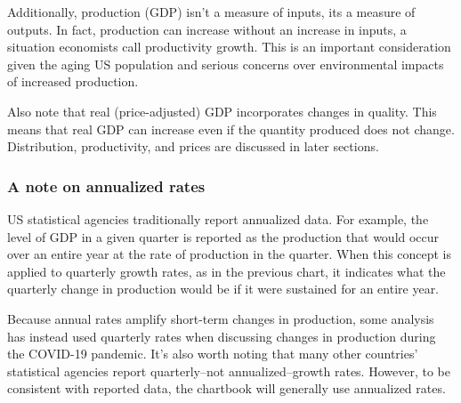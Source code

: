 \documentclass{report}
\begin{document}
\begin{minipage}{0.76\textwidth}
Additionally, production (GDP) isn't a measure of inputs, its a measure of outputs. In fact, production can increase without an increase in inputs, a situation economists call productivity growth. This is an important consideration given the aging US population and serious concerns over environmental impacts of increased production. 

Also note that real (price-adjusted) GDP incorporates changes in quality. This means that real GDP can increase even if the quantity produced does not change. Distribution, productivity, and prices are discussed in later sections.
\subsubsection*{\color{black!70}\seriffont A note on annualized rates}
\small US statistical agencies traditionally report annualized data. For example, the level of GDP in a given quarter is reported as the production that would occur over an entire year at the rate of production in the quarter. When this concept is applied to quarterly growth rates, as in the previous chart, it indicates what the quarterly change in production would be if it were sustained for an entire year. 

Because annual rates amplify short-term changes in production, some analysis has instead used quarterly rates when discussing changes in production during the COVID-19 pandemic. It's also worth noting that many other countries' statistical agencies report quarterly--not annualized--growth rates. However, to be consistent with reported data, the chartbook will generally use annualized rates.
\end{minipage}
\newpage
\end{document}
